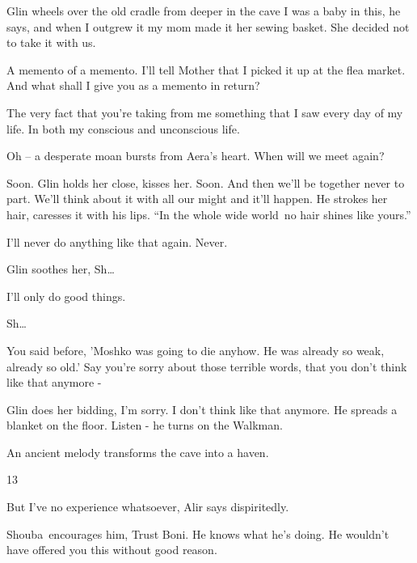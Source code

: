 \documentclass[twoside,11pt]{book}
\begin{document}
Glin wheels over the old cradle from deeper in the cave {\textquotedbl}I was a baby in this,{\textquotedbl} he says,
{\textquotedbl}and when I outgrew it my mom made it her sewing basket. She decided not to take it with
us.{\textquotedbl} 

{\textquotedbl}A memento of a memento. I'll tell Mother that I picked it up at the flea market. And what shall I give
you as a memento in return?{\textquotedbl}

{\textquotedbl}The very fact that you're taking from me something that I saw every day of my life. In both my conscious
and unconscious life.{\textquotedbl}

{\textquotedbl}Oh -- {\textquotedbl} a desperate moan bursts from Aera's heart. {\textquotedbl}When will we meet
again?{\textquotedbl} 

{\textquotedbl}Soon.{\textquotedbl} Glin holds her close, kisses her. {\textquotedbl}Soon. And then we'll be together
never to part. We'll think about it with all our might and it'll happen.{\textquotedbl} He strokes her hair, caresses
it with his lips. ``In the whole wide world~no hair shines like yours.''

{\textquotedbl}I'll never do anything like that again. Never.{\textquotedbl} 

Glin soothes her, {\textquotedbl}Sh{\dots}{\textquotedbl}~ 

{\textquotedbl}I'll only do good things.{\textquotedbl} 

{\textquotedbl}Sh{\dots}{\textquotedbl} 

{\textquotedbl}You said before, 'Moshko was going to die anyhow. He was already so weak, already so old.' Say you're
sorry about those terrible words, that you don't think like that anymore -{\textquotedbl} 

Glin does her bidding, {\textquotedbl}I'm sorry. I don't think like that anymore.{\textquotedbl} He spreads a blanket on
the floor. {\textquotedbl}Listen -{\textquotedbl} he turns on the Walkman.

An ancient melody transforms the cave into a haven.\ 


\bigskip

13

{\textquotedbl}But I've no experience whatsoever,{\textquotedbl} Alir says dispiritedly.

Shouba\ encourages him, {\textquotedbl}Trust Boni. He knows what he's doing. He wouldn't have offered you this without
good reason.{\textquotedbl} 
\end{document}
